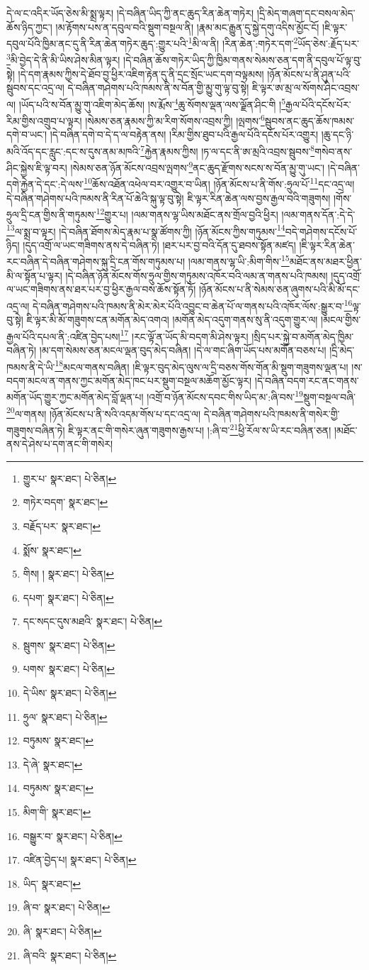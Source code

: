 དེ་ལ་ང་འདིར་ཡོད་ཅེས་མི་སྨྲ་ལྟར། །དེ་བཞིན་ཡིད་ཀྱི་ནང་ཆུད་རིན་ཆེན་གཏེར། །དྲི་མེད་གཞག་དང་བསལ་མེད་ཆོས་ཉིད་ཀྱང་། །མ་རྟོགས་པས་ན་དབུལ་བའི་སྡུག་བསྔལ་ནི། །རྣམ་མང་རྒྱུན་དུ་སྐྱེ་དགུ་འདིས་མྱོང་ངོ། །ཇི་ལྟར་དབུལ་པོའི་ཁྱིམ་ནང་དུ་ནི་རིན་ཆེན་གཏེར་ཆུད་:གྱུར་པའི་\footnote{གྱུར་པ་  སྣར་ཐང་།  པེ་ཅིན། }མི་ལ་ནི། །རིན་ཆེན་:གཏེར་དག་\footnote{གཏེར་བདག་  སྣར་ཐང་། }ཡོད་ཅེས་:རྗོད་པར་\footnote{བརྗོད་པར་  སྣར་ཐང་། }མི་བྱེད་དེ་ནི་མི་ཡིས་ཤེས་མིན་ལྟར། །དེ་བཞིན་ཆོས་གཏེར་ཡིད་ཀྱི་ཁྱིམ་གནས་སེམས་ཅན་དག་ནི་དབུལ་པོ་ལྟ་བུ་སྟེ། །དེ་དག་རྣམས་ཀྱིས་དེ་ཐོབ་བྱ་ཕྱིར་འཇིག་རྟེན་དུ་ནི་དྲང་སྲོང་ཡང་དག་བལྟམས། །ཉོན་མོངས་པ་ནི་ཤུན་པའི་སྦུབས་དང་འདྲ་ལ། དེ་བཞིན་གཤེགས་པའི་ཁམས་ནི་ས་བོན་གྱི་མྱུ་གུ་ལྟ་བུ་སྟེ། ཇི་ལྟར་ཨ་མྲ་ལ་སོགས་ཤིང་འབྲས་ལ། །ཡོད་པའི་ས་བོན་མྱུ་གུ་འཇིག་མེད་ཆོས། །ས་རྨོས་\footnote{སྨོས་  སྣར་ཐང་། }ཆུ་སོགས་ལྡན་ལས་ལྗོན་ཤིང་གི །\footnote{གིས། །  སྣར་ཐང་།  པེ་ཅིན། }རྒྱལ་པོའི་དངོས་པོར་རིམ་གྱིས་འགྲུབ་པ་ལྟར། །སེམས་ཅན་རྣམས་ཀྱི་མ་རིག་སོགས་འབྲས་ཀྱི། །ལྤགས་\footnote{དཔག་  སྣར་ཐང་།  པེ་ཅིན། }སྦུབས་ནང་ཆུད་ཆོས་ཁམས་དགེ་བ་ཡང་། །དེ་བཞིན་དགེ་བ་དེ་ད་ལ་བརྟེན་ནས། །རིམ་གྱིས་ཐུབ་པའི་རྒྱལ་པོའི་དངོས་པོར་འགྱུར། །ཆུ་དང་ཉི་མའི་འོད་དང་རླུང་:དང་ས་དུས་ནམ་མཁའི་\footnote{དང་སདང་དུས་མཐའི་  སྣར་ཐང་།  པེ་ཅིན། }རྐྱེན་རྣམས་ཀྱིས། །ཏ་ལ་དང་ནི་ཨ་མྲའི་འབྲས་སྦུབས་\footnote{སྦུགས་  སྣར་ཐང་།  པེ་ཅིན། }གསེབ་ནས་ཤིང་སྐྱེས་ཇི་ལྟ་བར། །སེམས་ཅན་ཉོན་མོངས་འབྲས་ལྤགས་\footnote{པགས་  སྣར་ཐང་།  པེ་ཅིན། }ནང་ཆུད་རྫོགས་སངས་ས་བོན་མྱུ་གུ་ཡང་། །དེ་བཞིན་དགེ་རྐྱེན་དེ་དང་:དེ་ལས་\footnote{དེ་ཡིས་  སྣར་ཐང་།  པེ་ཅིན། }ཆོས་འཐོན་འཕེལ་བར་འགྱུར་བ་ཡིན། །ཉོན་མོངས་པ་ནི་གོས་:ཧྲུལ་པོ་\footnote{ཧྲུལ་  སྣར་ཐང་།  པེ་ཅིན། }དང་འདྲ་ལ། དེ་བཞིན་གཤེགས་པའི་ཁམས་ནི་རིན་པོ་ཆེའི་སྐུ་ལྟ་བུ་སྟེ། ཇི་ལྟར་རིན་ཆེན་ལས་བྱས་རྒྱལ་བའི་གཟུགས། །གོས་ཧྲུལ་དྲི་ངན་གྱིས་ནི་གཏུམས་\footnote{བཏུམས་  སྣར་ཐང་། }གྱུར་པ། །ལམ་གནས་ལྷ་ཡིས་མཐོང་ནས་གྲོལ་བྱའི་ཕྱིར། །ལམ་གནས་དོན་:དེ་དེ་\footnote{དེ་ཞེ་  སྣར་ཐང་། }ལ་སྨྲ་བ་ལྟར། །དེ་བཞིན་ཐོགས་མེད་རྣམ་པ་སྣ་ཚོགས་ཀྱི། །ཉོན་མོངས་ཀྱིས་གཏུམས་\footnote{བཏུམས་  སྣར་ཐང་། }བདེ་གཤེགས་དངོས་པོ་ཉིད། །དུད་འགྲོ་ལ་ཡང་གཟིགས་ནས་དེ་བཞིན་ཏེ། །ཐར་པར་བྱ་བའི་དོན་དུ་ཐབས་སྟོན་མཛད། །ཇི་ལྟར་རིན་ཆེན་རང་བཞིན་དེ་བཞིན་གཤེགས་སྐུ་དྲི་ངན་གོས་གཏུམས་པ། །ལམ་གནས་ལྷ་ཡི་:མིག་གིས་\footnote{མིག་གི་  སྣར་ཐང་། }མཐོང་ནས་མཐར་ཕྱིན་མི་ལ་སྟོན་པ་ལྟར། །དེ་བཞིན་ཉོན་མོངས་གོས་ཧྲུལ་གྱིས་གཏུམས་འཁོར་བའི་ལམ་ན་གནས་པའི་ཁམས། །དུད་འགྲོ་ལ་ཡང་གཟིགས་ནས་ཐར་པར་བྱ་ཕྱིར་རྒྱལ་བས་ཆོས་སྟོན་ཏོ། །ཉོན་མོངས་པ་ནི་སེམས་ཅན་ཞུགས་པའི་མི་མོ་དང་འདྲ་ལ། དེ་བཞིན་གཤེགས་པའི་ཁམས་ནི་མེར་མེར་པོའི་འབྱུང་བ་ཆེན་པོ་ལ་གནས་པའི་འཁོར་ལོས་:སྒྱུར་བ་\footnote{བསྒྱུར་བ་  སྣར་ཐང་།  པེ་ཅིན། }ལྟ་བུ་སྟེ། ཇི་ལྟར་མི་མོ་གཟུགས་ངན་མགོན་མེད་འགའ། །མགོན་མེད་འདུག་གནས་སུ་ནི་འདུག་གྱུར་ལ། །མངལ་གྱིས་རྒྱལ་པོའི་དཔལ་ནི་:འཛིན་བྱེད་པས།\footnote{འཛིན་བྱེད་པ།  སྣར་ཐང་།  པེ་ཅིན། } །རང་ལྟོ་ན་ཡོད་མི་བདག་མི་ཤེས་ལྟར། །སྲིད་པར་སྐྱེ་བ་མགོན་མེད་ཁྱིམ་བཞིན་ཏེ། །མ་དག་སེམས་ཅན་མངལ་ལྡན་བུད་མེད་བཞིན། །དེ་ལ་གང་ཞིག་ཡོད་པས་མགོན་བཅས་པ། །དྲི་མེད་ཁམས་ནི་དེ་ཡི་\footnote{ཡིད་  སྣར་ཐང་། }མངལ་གནས་བཞིན། །ཇི་ལྟར་བུད་མེད་ལུས་ལ་དྲི་བཅས་གོས་གོན་མི་སྡུག་གཟུགས་ལྡན་པ། །ས་བདག་མངལ་ན་གནས་ཀྱང་མགོན་མེད་ཁང་པར་སྡུག་བསྔལ་མཆོག་མྱོང་ལྟར། །དེ་བཞིན་བདག་རང་ནང་གནས་མགོན་ཡོད་གྱུར་ཀྱང་མགོན་མེད་བློ་ལྡན་པ། །འགྲོ་བ་ཉོན་མོངས་དབང་གིས་ཡིད་མ་:ཞི་བས་\footnote{ཞི་བ་  སྣར་ཐང་།  པེ་ཅིན། }སྡུག་བསྔལ་བཞི་\footnote{ཞི་  སྣར་ཐང་།  པེ་ཅིན། }ལ་གནས། །ཉོན་མོངས་པ་ནི་སའི་འདམ་གོས་པ་དང་འདྲ་ལ། དེ་བཞིན་གཤེགས་པའི་ཁམས་ནི་གསེར་གྱི་གཟུགས་བཞིན་ཏེ། ཇི་ལྟར་ནང་གི་གསེར་ཞུན་གཟུགས་རྒྱས་པ། །:ཞི་བ་\footnote{ཞི་བའི་  སྣར་ཐང་།  པེ་ཅིན། }ཕྱི་རོལ་ས་ཡི་རང་བཞིན་ཅན། །མཐོང་ནས་དེ་ཤེས་པ་དག་ནང་གི་གསེར། 